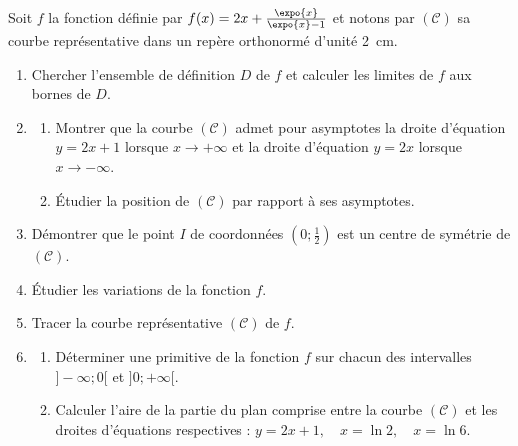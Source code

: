 \begin{exo}
\label{exo:el deux asymptotes}
      Soit $f$ la fonction d\'efinie par $f(x) = 2 x + \frac{\expo{x}}{\expo{x} - 1}$ et notons par $(\mathcal{C})$ sa courbe repr\'esentative dans un rep\`ere orthonorm\'e d'unit\'e 2~cm.
      \begin{enumerate}
      \item Chercher l'ensemble de d\'efinition $D$ de $f$ et calculer les limites de $f$ aux bornes de $D$.
      \item
            \begin{enumerate}
            \item Montrer que la courbe $(\mathcal{C})$ admet pour asymptotes la droite d'\'equation $y = 2x + 1$ lorsque $x \rightarrow + \infty$ et la droite d'\'equation $y = 2x$ lorsque $x \rightarrow - \infty$.
            \item \'Etudier la position de $(\mathcal{C})$ par rapport \`a ses asymptotes.
            \end{enumerate}
      \item D\'emontrer que le point $I$ de coordonn\'ees $\left( 0 ; \frac{1}{2} \right)$ est un centre de sym\'etrie de $(\mathcal{C})$.
      \item \'Etudier les variations de la fonction $f$.
      \item Tracer la courbe repr\'esentative $(\mathcal{C})$ de $f$.
      \item
            \begin{enumerate}
            \item D\'eterminer une primitive de la fonction $f$ sur chacun des intervalles $]-\infty ; 0[$ et $]0 ; +\infty[$.
            \item Calculer l'aire de la partie du plan comprise entre la courbe $(\mathcal{C})$ et les droites d'\'equations respectives :
                  $ y = 2x + 1 , \quad x = \ln 2 , \quad x = \ln 6 $.
            \end{enumerate}
      \end{enumerate}
\end{exo}
